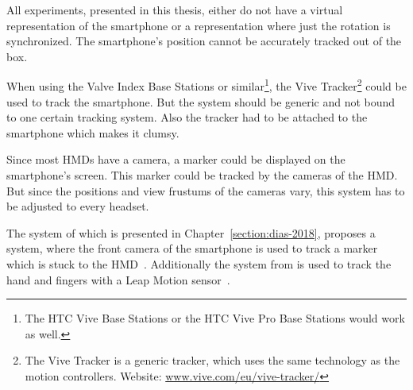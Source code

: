 All experiments, presented in this thesis, either do not have a virtual representation of the smartphone or a representation where just the rotation is synchronized. The smartphone's position cannot be accurately tracked out of the box. 

When using the Valve Index Base Stations or similar\footnote{The HTC Vive Base Stations or the HTC Vive Pro Base Stations would work as well.}, the Vive Tracker\footnote{The Vive Tracker is a generic tracker, which uses the same technology as the motion controllers. Website: \href{https://www.vive.com/eu/vive-tracker/}{www.vive.com/eu/vive-tracker/}} could be used to track the smartphone. But the system should be generic and not bound to one certain tracking system. Also the tracker had to be attached to the smartphone which makes it clumsy.

Since most \acp{HMD} have a camera, a marker could be displayed on the smartphone's screen. This marker could be tracked by the cameras of the \ac{HMD}. But since the positions and view frustums of the cameras vary, this system has to be adjusted to every headset.

The system of \citeauthor{Dias.2018} which is presented in Chapter~\ref{section:dias-2018}, proposes a system, where the front camera of the smartphone is used to track a marker which is stuck to the \ac{HMD}~\cite[4]{Dias.2018}. Additionally the system from \citeauthor{Afonso.2017} is used to track the hand and fingers with a Leap Motion sensor~\cite[247]{Afonso.2017}.

